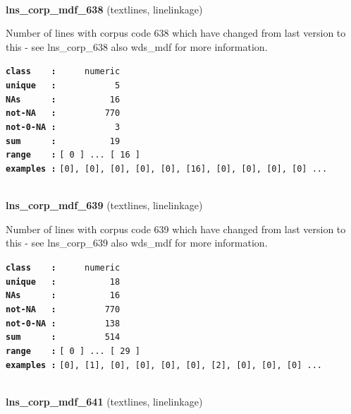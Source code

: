 \documentclass[]{article}
\begin{document}
~

\textbf{lns\_corp\_mdf\_638} (textlines, linelinkage)

Number of lines with corpus code 638 which have changed from last
version to this - see lns\_corp\_638 also wds\_mdf for more information.

\textbf{\texttt{class\ \ \ \ :}} \texttt{~~~~~numeric}\\
\textbf{\texttt{unique\ \ \ :}} \texttt{~~~~~~~~~~~5}\\
\textbf{\texttt{NAs\ \ \ \ \ \ :}} \texttt{~~~~~~~~~~16}\\
\textbf{\texttt{not-NA\ \ \ :}} \texttt{~~~~~~~~~770}\\
\textbf{\texttt{not-0-NA\ :}} \texttt{~~~~~~~~~~~3}\\
\textbf{\texttt{sum\ \ \ \ \ \ :}} \texttt{~~~~~~~~~~19}\\
\textbf{\texttt{range\ \ \ \ :}}
\texttt{{[}\ 0\ {]}\ ...\ {[}\ 16\ {]}}\\
\textbf{\texttt{examples\ :}}
\texttt{{[}0{]},\ {[}0{]},\ {[}0{]},\ {[}0{]},\ {[}0{]},\ {[}16{]},\ {[}0{]},\ {[}0{]},\ {[}0{]},\ {[}0{]}\ ...}\\

~

\textbf{lns\_corp\_mdf\_639} (textlines, linelinkage)

Number of lines with corpus code 639 which have changed from last
version to this - see lns\_corp\_639 also wds\_mdf for more information.

\textbf{\texttt{class\ \ \ \ :}} \texttt{~~~~~numeric}\\
\textbf{\texttt{unique\ \ \ :}} \texttt{~~~~~~~~~~18}\\
\textbf{\texttt{NAs\ \ \ \ \ \ :}} \texttt{~~~~~~~~~~16}\\
\textbf{\texttt{not-NA\ \ \ :}} \texttt{~~~~~~~~~770}\\
\textbf{\texttt{not-0-NA\ :}} \texttt{~~~~~~~~~138}\\
\textbf{\texttt{sum\ \ \ \ \ \ :}} \texttt{~~~~~~~~~514}\\
\textbf{\texttt{range\ \ \ \ :}}
\texttt{{[}\ 0\ {]}\ ...\ {[}\ 29\ {]}}\\
\textbf{\texttt{examples\ :}}
\texttt{{[}0{]},\ {[}1{]},\ {[}0{]},\ {[}0{]},\ {[}0{]},\ {[}0{]},\ {[}2{]},\ {[}0{]},\ {[}0{]},\ {[}0{]}\ ...}\\

~

\textbf{lns\_corp\_mdf\_641} (textlines, linelinkage)
\end{document}
